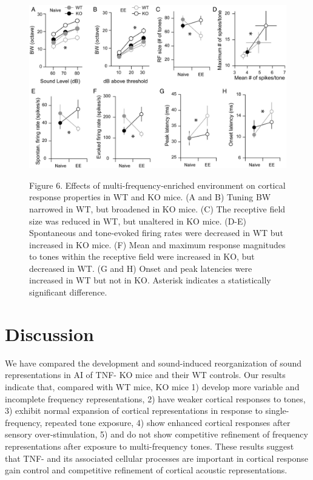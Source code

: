 \begin{figure}[h]
	\centering
		\includegraphics[width=6in]{images/C3F6}
	\begin{changemargin}{1in}{1in}
	\footnotesize{Figure 6. Effects of multi-frequency-enriched environment on cortical response properties in WT and KO mice. (A and B) Tuning BW narrowed in WT, but broadened in KO mice. (C) The receptive field size was reduced in WT, but unaltered in KO mice. (D-E) Spontaneous and tone-evoked firing rates were decreased in WT but increased in KO mice. (F) Mean and maximum response magnitudes to tones within the receptive field were increased in KO, but decreased in WT. (G and H) Onset and peak latencies were increased in WT but not in KO. Asterisk indicates a statistically significant difference.}
	\end{changemargin}
\end{figure}

\section{Discussion}

We have compared the development and sound-induced reorganization of sound representations in AI of TNF-\textalpha{} KO mice and their WT controls. Our results indicate that, compared with WT mice, KO mice 1) develop more variable and incomplete frequency representations, 2) have weaker cortical responses to tones, 3) exhibit normal expansion of cortical representations in response to single-frequency, repeated tone exposure, 4) show enhanced cortical responses after sensory over-stimulation, 5) and do not show competitive refinement of frequency representations after exposure to multi-frequency tones. These results suggest that TNF-\textalpha{} and its associated cellular processes are important in cortical response gain control and competitive refinement of cortical acoustic representations.

